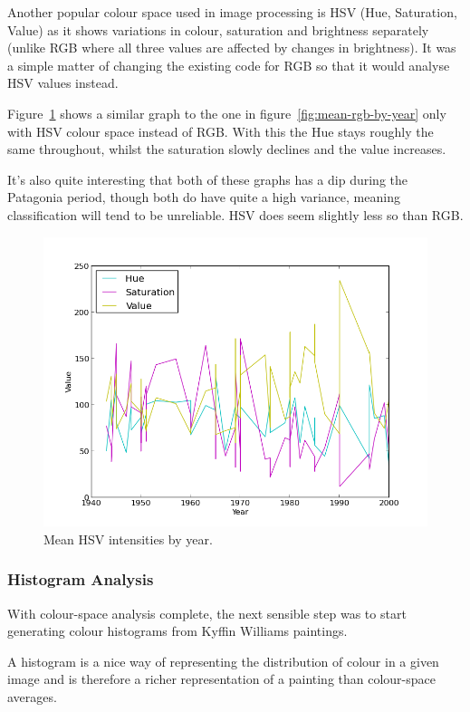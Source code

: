 \documentclass[11pt,fleqn,twoside]{article}
\begin{document}
Another popular colour space used in image processing is HSV (Hue, Saturation, Value) as it shows
variations in colour, saturation and brightness separately (unlike RGB where all three values are
affected by changes in brightness). It was a simple matter of changing the existing code for RGB
so that it would analyse HSV values instead.

Figure~\ref{fig:mean-hsv-by-year} shows a similar graph to the one in
figure~\ref{fig:mean-rgb-by-year} only with HSV colour space instead of RGB. With this the Hue 
stays roughly the same throughout, whilst the saturation slowly declines and the value increases.

It's also quite interesting that both of these graphs has a dip during the Patagonia period, though
both do have quite a high variance, meaning classification will tend to be unreliable. HSV does 
seem slightly less so than RGB.

\begin{figure}[p]
\includegraphics[scale=0.5]{img/hsv-legend-12-11-01.png}
\caption{Mean HSV intensities by year.}
\label{fig:mean-hsv-by-year}
\end{figure}


\subsubsection{Histogram Analysis}
With colour-space analysis complete, the next sensible step was to start generating colour 
histograms from Kyffin Williams paintings.

A histogram is a nice way of representing the distribution of colour in a given image and is 
therefore a richer representation of a painting than colour-space averages.
\end{document}
